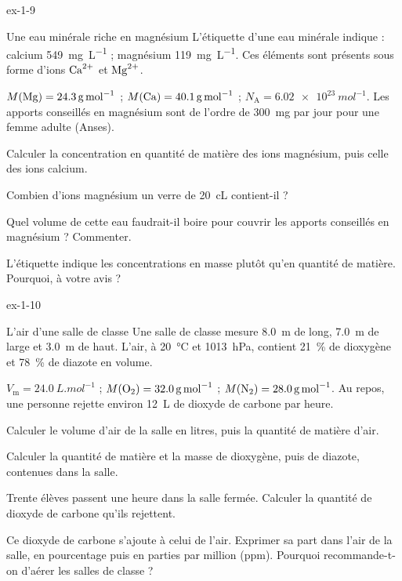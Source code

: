 \begin{blocLivre}{ex-1-9}
\begin{exercice}[2]{Une eau minérale riche en magnésium}
L'étiquette d'une eau minérale indique : calcium \qty{549}{mg.L^{-1}} ; magnésium \qty{119}{mg.L^{-1}}. Ces éléments sont présents
sous forme d'ions $\ce{Ca^{2+}}$ et $\ce{Mg^{2+}}$.
\begin{donnees}
$M(\ce{Mg})=\qty{24,3}{g.mol^{-1}}$ ; $M(\ce{Ca})=\qty{40,1}{g.mol^{-1}}$ ; $N_\mathrm{A}=\qty{6,02e23}{mol^{-1}}$. Les apports conseillés en magnésium
sont de l'ordre de \qty{300}{mg} par jour pour une femme adulte (Anses).
\end{donnees}
\begin{questions}
\item Calculer la concentration en quantité de matière des ions magnésium, puis celle des ions calcium.
\item Combien d'ions magnésium un verre de \qty{20}{cL} contient-il ?
\item Quel volume de cette eau faudrait-il boire pour couvrir les apports conseillés en magnésium ? Commenter.
\item L'étiquette indique les concentrations en masse plutôt qu'en quantité de matière. Pourquoi, à votre avis ?
\end{questions}
\end{exercice}
\end{blocLivre}
\begin{blocLivre}{ex-1-10}
\begin{exercice}[2]{L'air d'une salle de classe}
Une salle de classe mesure \qty{8,0}{m} de long, \qty{7,0}{m} de large et \qty{3,0}{m} de haut. L'air, à \qty{20}{\degreeCelsius} et \qty{1013}{hPa}, contient
21~\% de dioxygène et 78~\% de diazote en volume.
\begin{donnees}
$V_\mathrm{m}=\qty{24,0}{L.mol^{-1}}$ ; $M(\ce{O2})=\qty{32,0}{g.mol^{-1}}$ ; $M(\ce{N2})=\qty{28,0}{g.mol^{-1}}$. Au repos, une personne rejette environ \qty{12}{L} de
dioxyde de carbone par heure.
\end{donnees}
\begin{questions}
\item Calculer le volume d'air de la salle en litres, puis la quantité de matière d'air.
\item Calculer la quantité de matière et la masse de dioxygène, puis de diazote, contenues dans la salle.
\item Trente élèves passent une heure dans la salle fermée. Calculer la quantité de dioxyde de carbone qu'ils rejettent.
\item Ce dioxyde de carbone s'ajoute à celui de l'air. Exprimer sa part dans l'air de la salle, en pourcentage puis en
parties par million (ppm). Pourquoi recommande-t-on d'aérer les salles de classe ?
\end{questions}
\end{exercice}
\end{blocLivre}
